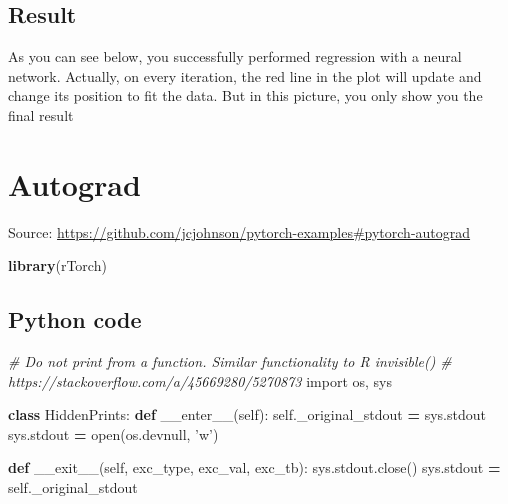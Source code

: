 \documentclass[]{book}
\newenvironment{Shaded}{\begin{snugshade}}{\end{snugshade}}
\newcommand{\BuiltInTok}[1]{#1}
\newcommand{\CommentTok}[1]{\textcolor[rgb]{0.56,0.35,0.01}{\textit{#1}}}
\newcommand{\FunctionTok}[1]{\textcolor[rgb]{0.00,0.00,0.00}{#1}}
\newcommand{\ImportTok}[1]{#1}
\newcommand{\KeywordTok}[1]{\textcolor[rgb]{0.13,0.29,0.53}{\textbf{#1}}}
\newcommand{\NormalTok}[1]{#1}
\newcommand{\OperatorTok}[1]{\textcolor[rgb]{0.81,0.36,0.00}{\textbf{#1}}}
\newcommand{\StringTok}[1]{\textcolor[rgb]{0.31,0.60,0.02}{#1}}
\newcommand{\VariableTok}[1]{\textcolor[rgb]{0.00,0.00,0.00}{#1}}
\begin{document}
\hypertarget{result}{%
\section{Result}\label{result}}

As you can see below, you successfully performed regression with a neural network. Actually, on every iteration, the red line in the plot will update and change its position to fit the data. But in this picture, you only show you the final result

\hypertarget{autograd}{%
\chapter{Autograd}\label{autograd}}

Source: \url{https://github.com/jcjohnson/pytorch-examples\#pytorch-autograd}

\begin{Shaded}
\begin{Highlighting}[]
\KeywordTok{library}\NormalTok{(rTorch)}
\end{Highlighting}
\end{Shaded}

\hypertarget{python-code}{%
\section{Python code}\label{python-code}}

\begin{Shaded}
\begin{Highlighting}[]
\CommentTok{# Do not print from a function. Similar functionality to R invisible()}
\CommentTok{# https://stackoverflow.com/a/45669280/5270873}
\ImportTok{import}\NormalTok{ os, sys}

\KeywordTok{class}\NormalTok{ HiddenPrints:}
    \KeywordTok{def} \FunctionTok{__enter__}\NormalTok{(}\VariableTok{self}\NormalTok{):}
        \VariableTok{self}\NormalTok{._original_stdout }\OperatorTok{=}\NormalTok{ sys.stdout}
\NormalTok{        sys.stdout }\OperatorTok{=} \BuiltInTok{open}\NormalTok{(os.devnull, }\StringTok{'w'}\NormalTok{)}

    \KeywordTok{def} \FunctionTok{__exit__}\NormalTok{(}\VariableTok{self}\NormalTok{, exc_type, exc_val, exc_tb):}
\NormalTok{        sys.stdout.close()}
\NormalTok{        sys.stdout }\OperatorTok{=} \VariableTok{self}\NormalTok{._original_stdout}
\end{Highlighting}
\end{Shaded}
\end{document}

